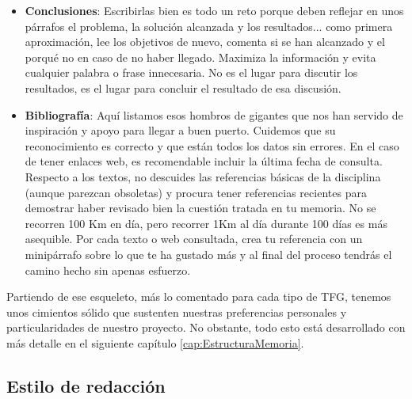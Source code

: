 \begin{itemize}
    \item \textbf{Conclusiones}: Escribirlas bien es todo un reto porque deben reflejar en unos párrafos el problema, la solución alcanzada y los resultados... como primera aproximación, lee los objetivos de nuevo, comenta si se han alcanzado y el porqué no en caso de no haber llegado. Maximiza la información y evita cualquier palabra o frase innecesaria. No es el lugar para discutir los resultados, es el lugar para concluir el resultado de esa discusión. 

    \item \textbf{Bibliografía}: Aquí listamos esos hombros de gigantes que nos han servido de inspiración y apoyo para llegar a buen puerto. Cuidemos que su reconocimiento es correcto y que están todos los datos sin errores. En el caso de tener enlaces web, es recomendable incluir la última fecha de consulta. Respecto a los textos, no descuides las referencias básicas de la disciplina (aunque parezcan obsoletas) y procura tener referencias recientes para demostrar haber revisado bien la cuestión tratada en tu memoria. No se recorren 100 Km en día, pero recorrer 1Km al día durante 100 días es más asequible. Por cada texto o web consultada, crea tu referencia con un minipárrafo sobre lo que te ha gustado más y al final del proceso tendrás el camino hecho sin apenas esfuerzo.
    
\end{itemize}

Partiendo de ese esqueleto, más lo comentado para cada tipo de TFG, tenemos unos cimientos sólido que sustenten nuestras preferencias personales y particularidades de nuestro proyecto. No obstante, todo esto está desarrollado con más detalle en el siguiente capítulo \ref{cap:EstructuraMemoria}.

\subsection{Estilo de redacción} %


